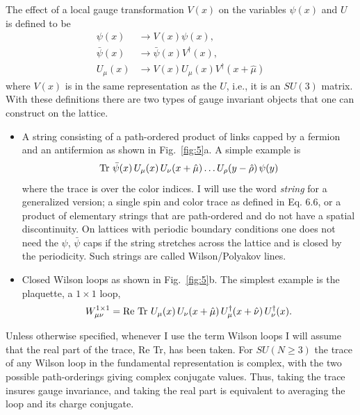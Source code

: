The effect of a local gauge transformation \(V(x)\) on the variables \(\psi(x)\) and \(U\) is defined to be
\begin{equation}
\begin{aligned}
\psi(x) &\to V(x)\psi(x) , \\
\bar{\psi}(x) &\to \bar{\psi}(x)V^\dagger(x) , \\
U_\mu(x) &\to V(x)U_\mu(x)V^\dagger(x+\hat{\mu})
\end{aligned}
\end{equation}
where \(V(x)\) is in the same representation as the \(U\), i.e., it is an \(SU(3)\) matrix. With these definitions there are two types of gauge invariant objects that one can construct on the lattice.
\begin{itemize}
  \item A string consisting of a path-ordered product of links capped by a fermion and an antifermion as shown in Fig.~\ref{fig:5}a. A simple example is
  \begin{equation}
  \Tr\, \bar{\psi}(x)\, U_\mu(x)\, U_\nu(x+\hat{\mu}) \ldots U_\rho(y-\hat{\rho})\, \psi(y)
  \end{equation}
  where the trace is over the color indices. I will use the word \emph{string} for a generalized version; a single spin and color trace as defined in Eq. 6.6, or a product of elementary strings that are path-ordered and do not have a spatial discontinuity. On lattices with periodic boundary conditions one does not need the \(\psi\), \(\bar{\psi}\) caps if the string stretches across the lattice and is closed by the periodicity. Such strings are called Wilson/Polyakov lines.
  \item Closed Wilson loops as shown in Fig.~\ref{fig:5}b. The simplest example is the plaquette, a \(1 \times 1\) loop,
  \begin{equation}
  W^{\mathrm{1\times 1}}_{\mu\nu} = \Re\, \Tr\, U_\mu(x)\, U_\nu(x+\hat{\mu})\, U_\mu^\dagger(x+\hat{\nu})\, U_\nu^\dagger(x) .
  \end{equation}
\end{itemize}
Unless otherwise specified, whenever I use the term Wilson loops I will assume that the real part of the trace, Re Tr, has been taken. For \(SU(N \ge 3)\) the trace of any Wilson loop in the fundamental representation is complex, with the two possible path-orderings giving complex conjugate values. Thus, taking the trace insures gauge invariance, and taking the real part is equivalent to averaging the loop and its charge conjugate.

